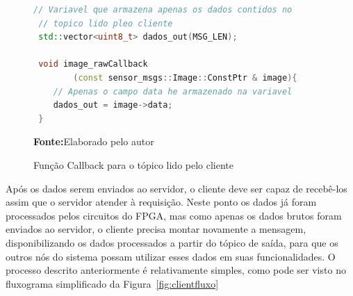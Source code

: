 \begin{figure}[ht]
\caption{Função Callback para o tópico lido pelo cliente}
\begin{center}
\begin{lstlisting}[language=C++, backgroundcolor=\color{gray!10}]
 // Variavel que armazena apenas os dados contidos no 
 // topico lido pleo cliente
 std::vector<uint8_t> dados_out(MSG_LEN);
 
 void image_rawCallback 
 		(const sensor_msgs::Image::ConstPtr & image){
 	// Apenas o campo data he armazenado na variavel
 	dados_out = image->data;
 }

\end{lstlisting}
{\small \textbf{Fonte:}Elaborado pelo autor}	
\end{center}\label{fig:codreaddata}
\end{figure}
		

Após os dados serem enviados ao servidor, o cliente deve ser capaz de recebê-los assim que o servidor atender à requisição. Neste ponto os dados já foram processados pelos circuitos do FPGA, mas como apenas os dados brutos foram enviados ao servidor, o cliente precisa montar novamente a mensagem, disponibilizando os dados processados a partir do tópico de saída, para que os outros nós do sistema possam utilizar esses dados em suas funcionalidades. O processo descrito anteriormente é relativamente simples, como pode ser visto no fluxograma simplificado da Figura~\ref{fig:clientfluxo}


